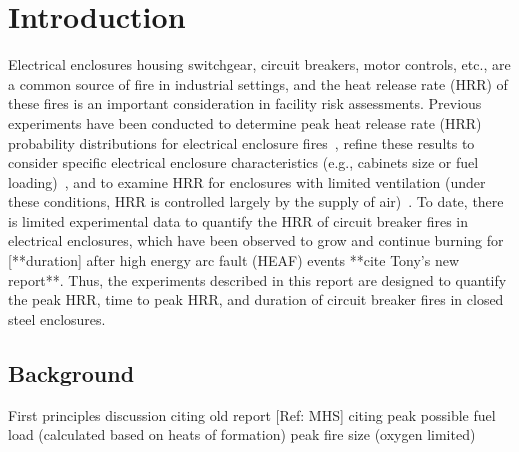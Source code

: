 \documentclass[12pt]{article}
\begin{document}
\pagebreak


\section{Introduction}

Electrical enclosures housing switchgear, circuit breakers, motor controls, etc., are a common source of fire in industrial settings, and the heat release rate (HRR) of these fires is an important consideration in facility risk assessments. Previous experiments have been conducted to determine peak heat release rate (HRR) probability distributions for electrical enclosure fires~\cite{NUREG/CR-7197}, refine these results to consider specific electrical enclosure characteristics (e.g., cabinets size or fuel loading)~\cite{NUREG-2178}, and to examine HRR for enclosures with limited ventilation (under these conditions, HRR is controlled largely by the supply of air)~\cite{OLIVE-FIRE}. To date, there is limited experimental data to quantify the HRR of circuit breaker fires in electrical enclosures, which have been observed to grow and continue burning for [**duration] after high energy arc fault (HEAF) events **cite Tony's new report**. Thus, the experiments described in this report are designed to quantify the peak HRR, time to peak HRR, and duration of circuit breaker fires in closed steel enclosures.

\subsection{Background}
First principles discussion citing old report [Ref: MHS] citing peak possible fuel load (calculated based on heats of formation)
peak fire size (oxygen limited)
\end{document}
